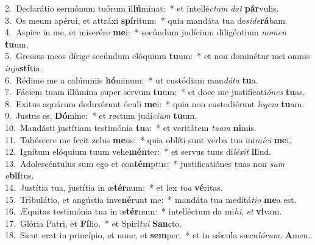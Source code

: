 {2.~}Declarátio sermónum tuórum il\textbf{lú}minat:~* et intellé\textit{ctum} \textit{dat} \textbf{pár}vulis.\\
{3.~}Os meum apérui, et attráxi \textbf{spí}ritum:~* quia mandáta tua de\textit{si}\textit{de}\textbf{rá}bam.\\
{4.~}Aspice in me, et miserére \textbf{me}i:~* secúndum judícium diligéntium \textit{no}\textit{men} \textbf{tu}um.\\
{5.~}Gressus meos dírige secúndum elóquium \textbf{tu}um:~* et non dominétur mei omnis \textit{in}\textit{ju}\textbf{stí}tia.\\
{6.~}Rédime me a calúmniis \textbf{hó}minum:~* ut custódiam man\textit{dá}\textit{ta} \textbf{tu}a.\\
{7.~}Fáciem tuam illúmina super servum \textbf{tu}um:~* et doce me justificati\textit{ó}\textit{nes} \textbf{tu}as.\\
{8.~}Exitus aquárum deduxérunt óculi \textbf{me}i:~* quia non custodiérunt \textit{le}\textit{gem} \textbf{tu}am.\\
{9.~}Justus es, \textbf{Dó}mine:~* et rectum judí\textit{ci}\textit{um} \textbf{tu}um.\\
{10.~}Mandásti justítiam testimónia \textbf{tu}a:~* et veritátem \textit{tu}\textit{am} \textbf{ni}mis.\\
{11.~}Tabéscere me fecit zelus \textbf{me}us:~* quia oblíti sunt verba tua ini\textit{mí}\textit{ci} \textbf{me}i.\\
{12.~}Ignítum elóquium tuum vehe\textbf{mén}ter:~* et servus tuus di\textit{lé}\textit{xit} \textbf{il}lud.\\
{13.~}Adolescéntulus sum ego et con\textbf{tém}ptus:~* justificatiónes tuas non \textit{sum} \textit{o}\textbf{blí}tus.\\
{14.~}Justítia tua, justítia in æ\textbf{tér}num:~* et lex \textit{tu}\textit{a} \textbf{vé}ritas.\\
{15.~}Tribulátio, et angústia inve\textbf{né}runt me:~* mandáta tua meditá\textit{ti}\textit{o} \textbf{me}a est.\\
{16.~}Æquitas testimónia tua in æ\textbf{tér}num:~* intelléctum da mi\textit{hi}, \textit{et} \textbf{vi}vam.\\
{17.~}Glória Patri, et \textbf{Fí}lio,~* et Spirí\textit{tu}\textit{i} \textbf{San}cto.\\
{18.~}Sicut erat in princípio, et nunc, et \textbf{sem}per,~* et in sǽcula sæcu\textit{ló}\textit{rum}. \textbf{A}men.\\
